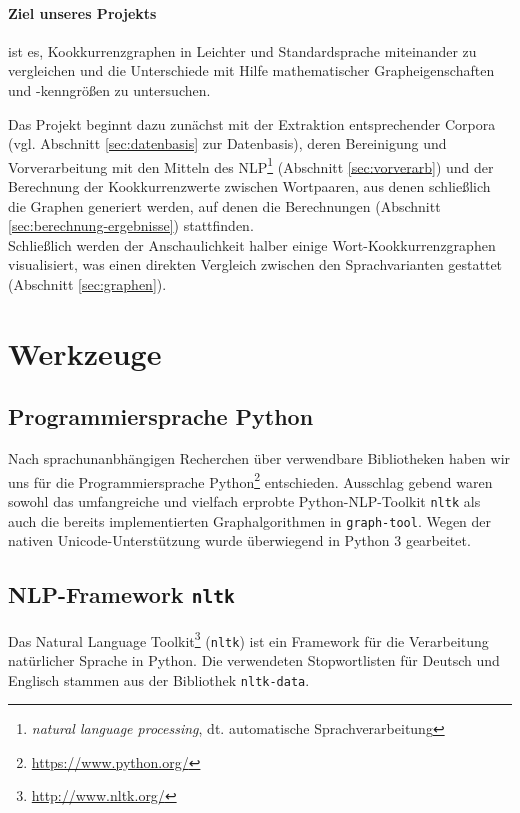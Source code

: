 \documentclass[11pt, a4paper]{article}
\begin{document}
\paragraph{Ziel unseres Projekts} ist es, Kookkurrenzgraphen in Leichter und
Standardsprache miteinander zu vergleichen und die Unterschiede mit Hilfe
mathematischer Grapheigenschaften und -kenngrößen zu untersuchen.

Das Projekt beginnt dazu zunächst mit der Extraktion entsprechender Corpora
(vgl. Abschnitt \ref{sec:datenbasis} zur Datenbasis),
deren Bereinigung und Vorverarbeitung mit den Mitteln des NLP\footnote{
\emph{natural language processing}, dt. automatische Sprachverarbeitung}
(Abschnitt \ref{sec:vorverarb}) und der
Berechnung der Kookkurrenzwerte zwischen Wortpaaren, aus denen schließlich die
Graphen generiert werden, auf denen die Berechnungen
(Abschnitt \ref{sec:berechnung-ergebnisse}) stattfinden.\\
Schließlich werden der Anschaulichkeit halber einige Wort-Kookkurrenzgraphen
visualisiert, was einen direkten Vergleich zwischen den Sprachvarianten gestattet
(Abschnitt \ref{sec:graphen}).


\section{Werkzeuge}

\subsection{Programmiersprache Python}
Nach sprachunanbhängigen Recherchen über verwendbare Bibliotheken haben wir uns
für die Programmiersprache Python\footnote{\url{https://www.python.org/}}
entschieden.
Ausschlag gebend waren sowohl das umfangreiche und vielfach erprobte
Python-NLP-Toolkit \texttt{nltk} als auch die bereits implementierten
Graphalgorithmen in \texttt{graph-tool}.
Wegen der nativen Unicode-Unterstützung wurde überwiegend in Python 3 gearbeitet.

\subsection{NLP-Framework \texttt{nltk}}
Das Natural Language Toolkit\footnote{\url{http://www.nltk.org/}} (\texttt{nltk}) ist
ein Framework f\"ur die Verarbeitung natürlicher Sprache in Python.
Die verwendeten Stopwortlisten für Deutsch und Englisch stammen aus der
Bibliothek \texttt{nltk-data}.
\end{document}
